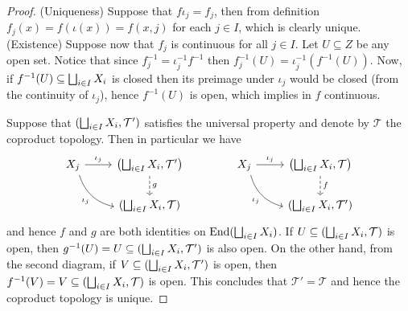\begin{proof}
  (Uniqueness) Suppose that \(f  \iota_j = f_j\), then from definition
  \(f_j(x) = f(\iota(x)) = f(x, j)\) for each \(j \in I\), which is clearly
  unique.
  (Existence) Suppose now that \(f_j\) is continuous for all \(j \in I\). Let
  \(U \subseteq Z\) be any open set. Notice that since \(f_j^{-1} = \iota_j^{-1}
   f^{-1}\) then \(f_j^{-1}(U) = \iota_j^{-1}(f^{-1}(U))\). Now, if
  \(f^{-1}(U) \subseteq \bigsqcup_{i \in I} X_i\) is closed then its preimage
  under \(\iota_j\) would be closed (from the continuity of \(\iota_j\)), hence
  \(f^{-1}(U)\) is open, which implies in \(f\) continuous.

  Suppose that \((\bigsqcup_{i \in I} X_i, \mathcal T')\) satisfies the universal
  property and denote by \(\mathcal T\) the coproduct topology. Then in
  particular we have
  \[
    \begin{tikzcd}
      X_j \ar[r, "\iota_j"] \ar[rd, bend right, swap, "\iota_j"]
        &\left( \bigatt_{i \in I} X_i, \mathcal T' \right)
        \ar[d, dashed, "g"] \\
        &(\bigatt_{i \in I} X_i, \mathcal T)
    \end{tikzcd}
    \qquad \qquad
    \begin{tikzcd}
      X_j \ar[r, "\iota_j"] \ar[rd, bend right, swap, "\iota_j"]
        &\left( \bigatt_{i \in I} X_i, \mathcal T \right)
        \ar[d, dashed, "f"] \\
        &(\bigatt_{i \in I} X_i, \mathcal T')
    \end{tikzcd}
  \]
  and hence \(f\) and \(g\) are both identities on \(\operatorname{End}(\bigsqcup_{i \in I} X_i)\). If
  \(U \subseteq (\bigsqcup_{i \in I} X_i, \mathcal T)\) is open, then \(g^{-1}(U) = U \subseteq (\bigsqcup_{i \in I}
  X_i, \mathcal T')\) is also open. On the other hand, from the second diagram,
  if \(V \subseteq (\bigsqcup_{i \in I} X_i, \mathcal T')\) is open, then \(f^{-1}(V) = V \subseteq (\bigsqcup_{i \in
  I} X_i, \mathcal T)\) is open. This concludes that \(\mathcal T' = \mathcal T\)
  and hence the coproduct topology is unique.
\end{proof}

